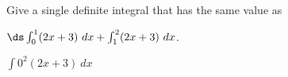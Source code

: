 {Give a single definite integral that has the same value as 

$\ds \int_0^1(2x+3)\ dx + \int_1^2 (2x+3)\ dx$.
}
{$\int 0^2 (2x+3)\ dx$
}

